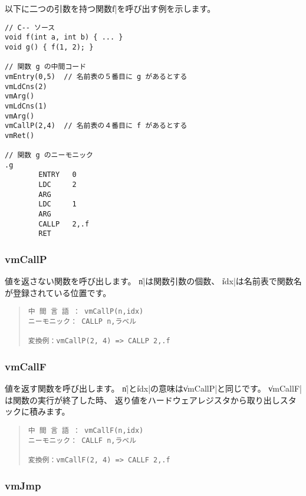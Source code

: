 以下に二つの引数を持つ関数\|f|を呼び出す例を示します。

\begin{mylist}
\begin{verbatim}
// C-- ソース
void f(int a, int b) { ... }
void g() { f(1, 2); }

// 関数 g の中間コード
vmEntry(0,5)  // 名前表の５番目に g があるとする
vmLdCns(2)
vmArg()
vmLdCns(1)
vmArg()
vmCallP(2,4)  // 名前表の４番目に f があるとする
vmRet()

// 関数 g のニーモニック
.g
        ENTRY   0
        LDC     2
        ARG
        LDC     1
        ARG
        CALLP   2,.f
        RET
\end{verbatim}
\end{mylist}

\subsubsection{vmCallP}

値を返さない関数を呼び出します。
\|n|は関数引数の個数、
\|idx|は名前表で関数名が登録されている位置です。

\begin{quote}
\begin{verbatim}
中 間 言 語 ： vmCallP(n,idx)
ニーモニック： CALLP n,ラベル

変換例：vmCallP(2, 4) => CALLP 2,.f
\end{verbatim}
\end{quote}

\subsubsection{vmCallF}

値を返す関数を呼び出します。
\|n|と\|idx|の意味は\|vmCallP|と同じです。
\|vmCallF|は関数の実行が終了した時、
返り値をハードウェアレジスタから取り出しスタックに積みます。

\begin{quote}
\begin{verbatim}
中 間 言 語 ： vmCallF(n,idx)
ニーモニック： CALLF n,ラベル

変換例：vmCallF(2, 4) => CALLF 2,.f
\end{verbatim}
\end{quote}

\subsubsection{vmJmp}

